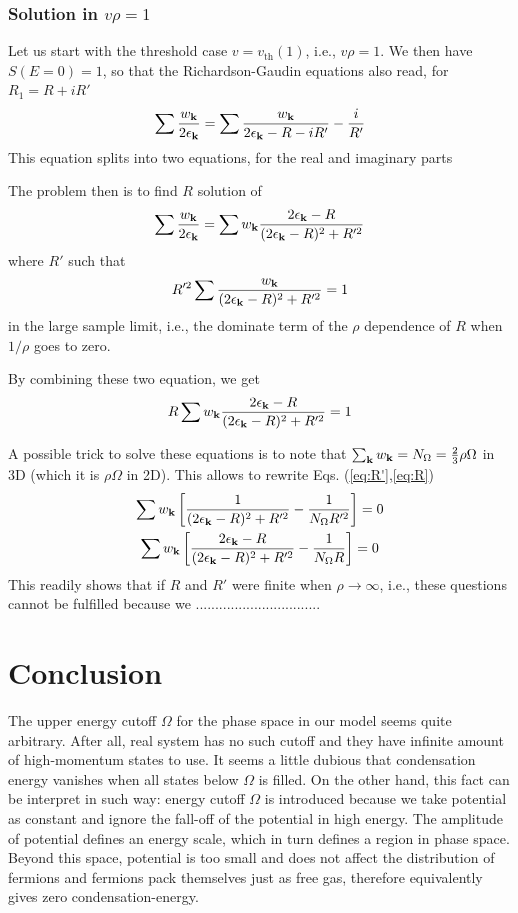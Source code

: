 \documentclass[aps,prb,showpacs,reprint]{revtex4-1}
\begin{document}
\subsubsection{Solution in $v\rho=1$}
Let us start with the threshold case $v=v_{\text{th}}(1)$, i.e., $v\rho=1$.  We then have $S(E=0)=1$, so that the Richardson-Gaudin equations also read, for $R_1=R+iR'$
\begin{equation}
\sum\frac{w_{\mathbf{k}}}{2\epsilon_{\mathbf{k}}}=\sum\frac{w_{\mathbf{k}}}{2\epsilon_{\mathbf{k}}-R-iR'}-\frac{i}{R'}
\label{eq:}
\end{equation}
This equation splits into two equations, for the real and imaginary parts

The problem then is to find $R$ solution of 
\begin{equation}
\sum\frac{w_{\mathbf{k}}}{2\epsilon_{\mathbf{k}}}=\sum{}w_{\mathbf{k}}\frac{2\epsilon_{\mathbf{k}}-R}{(2\epsilon_{\mathbf{k}}-R)^2+R'^2}
\label{eq:}
\end{equation}
where $R'$ such that 
\begin{equation}
R'^2\sum{}\frac{w_{\mathbf{k}}}{(2\epsilon_{\mathbf{k}}-R)^2+R'^2}=1
\label{eq:R'}
\end{equation}
in the large sample limit, i.e., the dominate term of the $\rho$ dependence of $R$ when $1/\rho$ goes to zero. 

By combining these two equation, we get
\begin{equation}
R\sum{}w_{\mathbf{k}}\frac{2\epsilon_{\mathbf{k}}-R}{(2\epsilon_{\mathbf{k}}-R)^2+R'^2}=1
\label{eq:R}
\end{equation}

A possible trick to solve these equations is to note that $\sum_{\mathbf{k}}{}w_{\mathbf{k}}=N_\Omega=\frac23\rho\Omega$ in 3D (which it is $\rho\Omega$ in 2D).  This allows to rewrite Eqs. (\ref{eq:R'},\ref{eq:R})
\begin{gather}
\sum{}w_{\mathbf{k}}\left[\frac{1}{(2\epsilon_{\mathbf{k}}-R)^2+R'^2}-\frac{1}{N_\Omega{}R'^2}\right]=0\\
\sum{}w_{\mathbf{k}}\left[\frac{2\epsilon_{\mathbf{k}}-R}{(2\epsilon_{\mathbf{k}}-R)^2+R'^2}-\frac{1}{N_\Omega{}R}\right]=0
\end{gather}
This readily shows that if $R$ and $R'$ were finite when $\rho\rightarrow\infty$, i.e., these questions cannot be fulfilled because we 
................................



\section{Conclusion\label{sec:conclusion}}
The upper energy cutoff $\Omega$ for the phase space in our model seems quite arbitrary.  After all, real system has no such cutoff and they have infinite amount of high-momentum states to use.   It seems a little dubious that condensation energy vanishes when all states below $\Omega$ is filled.  On the other hand, this fact can be interpret in such way:  energy cutoff $\Omega$ is introduced because we take potential as constant and ignore the fall-off of the potential in high energy.  The amplitude of potential defines an energy scale, which in turn defines a region in phase space.  Beyond this space, potential is too small and does not affect the distribution of fermions and fermions pack themselves just as free gas, therefore equivalently gives zero condensation-energy. 
\end{document}
